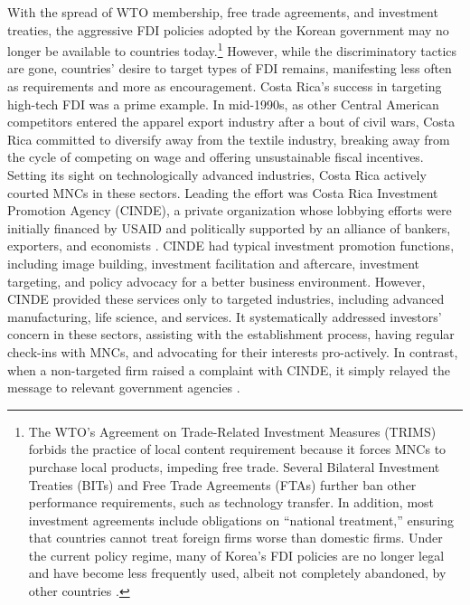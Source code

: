 With the spread of WTO membership, free trade agreements, and investment
treaties, the aggressive FDI policies adopted by the Korean government may no
longer be available to countries today.\footnote{The WTO's Agreement on
  Trade-Related Investment Measures (TRIMS) forbids the practice of local
  content requirement because it forces MNCs to purchase local products,
  impeding free trade. Several Bilateral Investment Treaties (BITs) and Free
  Trade Agreements (FTAs) further ban other performance requirements, such as
  technology transfer. In addition, most investment agreements include
  obligations on ``national treatment,'' ensuring that countries cannot treat
  foreign firms worse than domestic firms. Under the current policy regime, many
  of Korea's FDI policies are no longer legal and have become less frequently
  used, albeit not completely abandoned, by other countries \citep{Cosbey2015}.}
However, while the discriminatory tactics are gone, countries' desire to target
types of FDI remains, manifesting less often as requirements and more as
encouragement. Costa Rica's success in targeting high-tech FDI was a prime example. In mid-1990s, as other Central American competitors entered the
apparel export industry after a bout of civil wars, Costa Rica committed to
diversify away from the textile industry, breaking away from the cycle of
competing on wage and offering unsustainable fiscal incentives. Setting its
sight on technologically advanced industries, Costa Rica actively courted MNCs
in these sectors. Leading the effort was Costa Rica Investment Promotion Agency
(CINDE), a private organization whose lobbying efforts were initially financed
by USAID and politically supported by an alliance of bankers, exporters, and
economists \citep{Clark1995}. CINDE had typical investment promotion functions,
including image building, investment facilitation and aftercare, investment
targeting, and policy advocacy for a better business environment. However, CINDE
provided these services only to targeted industries, including advanced
manufacturing, life science, and services. It systematically addressed
investors' concern in these sectors, assisting with the establishment
process, having regular check-ins with MNCs, and advocating for their interests
pro-actively. In contrast, when a non-targeted firm raised a complaint with
CINDE, it simply relayed the message to relevant government agencies
\citep{OECD2013}.

